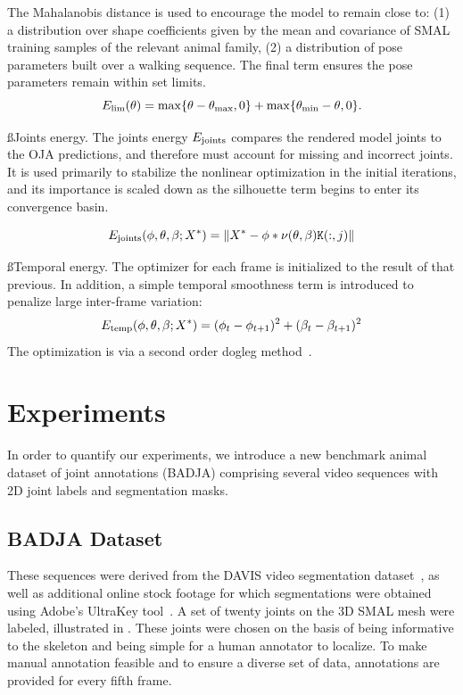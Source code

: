 
The Mahalanobis distance is used to encourage the model to remain close to: (1) a distribution over shape coefficients given by the mean and covariance of SMAL training samples of the relevant animal family, (2) a distribution of pose parameters built over a walking sequence. The final term ensures the pose parameters remain within set limits.
\begin{equation}
E_\textrm{lim}(\theta) = \max\{\theta - \theta_{\text{max}}, 0\} + \max\{\theta_{\text{min}} - \theta, 0\}.
\end{equation}

\ss{Joints energy.}
The joints energy $E_\textrm{joints}$ compares the rendered model joints to the OJA predictions, and therefore must account for missing and incorrect joints.  It is used primarily to stabilize the nonlinear optimization in the initial iterations, and its importance is scaled down as the silhouette term begins to enter its convergence basin.

\begin{equation}
E_\textrm{joints}(\phi, \theta, \beta; X^{*}) = 
\lVert X^{*} - \phi * \nu(\theta,\beta)\mathtt{K}(:,j) \rVert
\end{equation}

\ss{Temporal energy.}
The optimizer for each frame is initialized to the result of that previous. In addition, a simple temporal smoothness term is introduced to penalize large inter-frame variation:
\begin{equation}
E_\textrm{temp}(\phi, \theta, \beta; X^{*}) = (\phi_t - \phi_{t+1})^2 + (\beta_t - \beta_{t+1})^2
\end{equation}
The optimization is via a second order dogleg method~\cite{lourakis2005levenberg}.

\section{Experiments}
In order to quantify our experiments, we introduce a new benchmark animal dataset of joint annotations (BADJA) comprising several video sequences with 2D joint labels and segmentation masks.

\subsection{BADJA Dataset}
These sequences were derived from the DAVIS video segmentation dataset~\cite{Perazzi2016}, as well as additional online stock footage for which segmentations were obtained using Adobe's UltraKey tool~\cite{adobe_ultrakey}. A set of twenty joints on the 3D SMAL mesh were labeled, illustrated in . These joints were chosen on the basis of being informative to the skeleton and being simple for a human annotator to localize. To make manual annotation feasible and to ensure a diverse set of data, annotations are provided for every fifth frame. 

